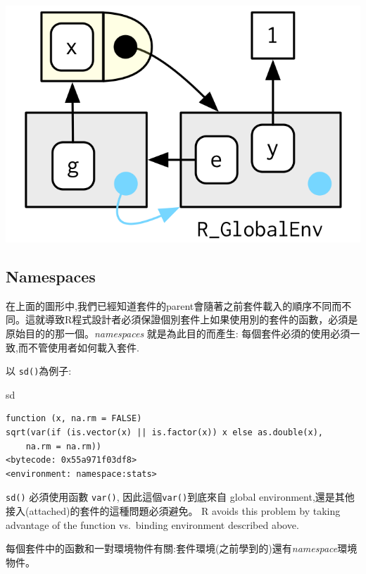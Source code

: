 \documentclass[]{book}
\newenvironment{Shaded}{\begin{snugshade}}{\end{snugshade}}
\newcommand{\NormalTok}[1]{#1}
\theoremstyle{definition}
\theoremstyle{definition}
\theoremstyle{definition}
\theoremstyle{remark}
\begin{document}
\begin{center}\includegraphics{diagrams/environments/binding-2} \end{center}

\hypertarget{namespaces}{%
\subsection{Namespaces}\label{namespaces}}

在上面的圖形中,我們已經知道套件的parent會隨著之前套件載入的順序不同而不同。這就導致R程式設計者必須保證個別套件上如果使用別的套件的函數，必須是原始目的的那一個。\emph{namespaces}
就是為此目的而產生: 每個套件必須的使用必須一致,而不管使用者如何載入套件.

以 \texttt{sd()}為例子:

\begin{Shaded}
\begin{Highlighting}[]
\NormalTok{sd}
\end{Highlighting}
\end{Shaded}

\begin{verbatim}
function (x, na.rm = FALSE) 
sqrt(var(if (is.vector(x) || is.factor(x)) x else as.double(x), 
    na.rm = na.rm))
<bytecode: 0x55a971f03df8>
<environment: namespace:stats>
\end{verbatim}

\texttt{sd()} 必須使用函數 \texttt{var()},
因此這個\texttt{var()}到底來自 global
environment,還是其他接入(attached)的套件的這種問題必須避免。 R avoids
this problem by taking advantage of the function vs.~binding environment
described above.

每個套件中的函數和一對環境物件有關:套件環境(之前學到的)還有\emph{namespace}環境物件。
\end{document}
